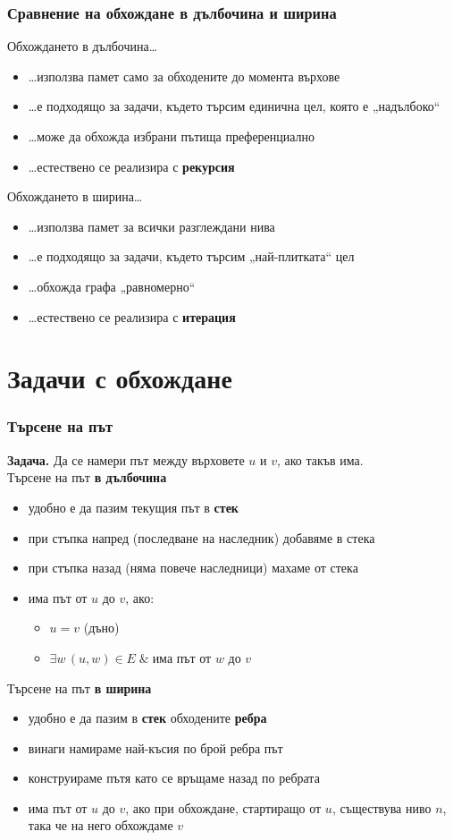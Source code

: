 \documentclass[alsotrans,beameroptions={aspectratio=169}]{beamerswitch}
\begin{document}
\begin{frame}
  \frametitle{Сравнение на обхождане в дълбочина и ширина}
  Обхождането в дълбочина\ldots
  \pause
  \begin{itemize}[<+->]
  \item \ldots използва памет само за обходените до момента върхове
  \item \ldots е подходящо за задачи, където търсим единична цел, която е „надълбоко“
  \item \ldots може да обхожда избрани пътища преференциално
  \item \ldots естествено се реализира с \textbf{рекурсия}
  \end{itemize}
  \onslide<+->
  Обхождането в ширина\ldots
  \begin{itemize}[<+->]
  \item \ldots използва памет за всички разглеждани нива
  \item \ldots е подходящо за задачи, където търсим „най-плитката“ цел
  \item \ldots обхожда графа „равномерно“
  \item \ldots естествено се реализира с \textbf{итерация}
  \end{itemize}
\end{frame}

\section{Задачи с обхождане}

\begin{frame}
  \frametitle{Търсене на път}
  \textbf{Задача. } Да се намери път между върховете $u$ и $v$, ако такъв има.\\\pause
  Търсене на път \textbf{в дълбочина}
  \pause
  \begin{itemize}[<+->]
  \item удобно е да пазим текущия път в \textbf{стек}
  \item при стъпка напред (последване на наследник) добавяме в стека
  \item при стъпка назад (няма повече наследници) махаме от стека
  \item има път от $u$ до $v$, ако:
    \begin{itemize}
    \item $u = v$ (дъно)
    \item $\exists w\, (u,w)\in E\;\&\;$има път от $w$ до $v$
    \end{itemize}
  \end{itemize}
  \onslide<+->
  Търсене на път \textbf{в ширина}
  \begin{itemize}[<+->]
  \item удобно е да пазим в \textbf{стек} обходените \textbf{ребра}
  \item винаги намираме най-късия по брой ребра път
  \item конструираме пътя като се връщаме назад по ребрата
  \item има път от $u$ до $v$, ако при обхождане, стартиращо от $u$, съществува  ниво $n$, така че на него обхождаме $v$
  \end{itemize}
\end{frame}
\end{document}

